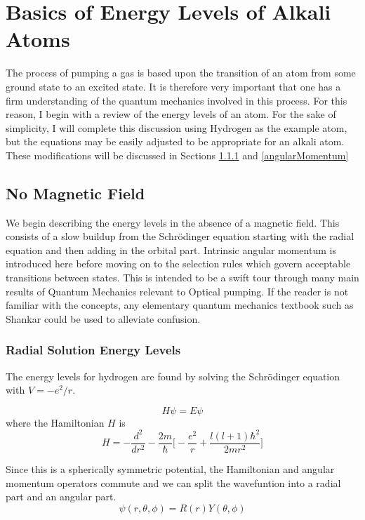 \documentclass[letter,12pt]{article}
\newcommand{\schr}{Schr\"odinger}
\begin{document}
\section{Basics of Energy Levels of Alkali Atoms}
The process of pumping a gas is based upon the transition
of an atom from some ground state to an excited state. 
It is therefore very important that one has a firm 
understanding of the quantum mechanics involved in this 
process. For this reason, I begin with a review of the energy
levels of an atom. For the sake of simplicity, I will complete
this discussion using
Hydrogen as the example atom, but the equations may be 
easily adjusted to be appropriate for an alkali atom.
These modifications will be discussed in Sections \ref{energyLevels}
and \ref{angularMomentum}
	\subsection{No Magnetic Field}
    We begin describing the energy levels in the absence of 
    a magnetic field. This consists of a slow buildup 
    from the Schr\"odinger equation starting with the radial
    equation and then adding in the orbital part. Intrinsic 
    angular momentum is introduced here before moving on to
    the selection rules which govern acceptable transitions
    between states. This is intended to be a swift tour through
	many main results of Quantum Mechanics relevant to 
	Optical pumping. If the reader is not familiar with the 
	concepts, any elementary quantum mechanics textbook
	such as Shankar could be used to alleviate confusion.
		\subsubsection{Radial Solution Energy Levels}\label{energyLevels}
		The energy levels for hydrogen are found by solving the
		{\schr} equation with $V=-e^2/r$. 

		\begin{equation}
		  H\psi = E\psi
		\end{equation}
		where the Hamiltonian $H$ is 
		\begin{equation}
			H=-\frac{d^2}{dr^2}-\frac{2m}{\hbar}\Big[-\frac{e^2}{r} + \frac{l(l+1)\hbar^2}{2mr^2}\Big]
		\end{equation}
		
		Since this is a spherically
		symmetric potential, the Hamiltonian and angular momentum
		operators commute and we can split the wavefuntion into a
		radial part and an angular part. 
		\begin{equation}
			\psi(r,\theta,\phi)=R(r)Y(\theta,\phi)
		\end{equation}
\end{document}
